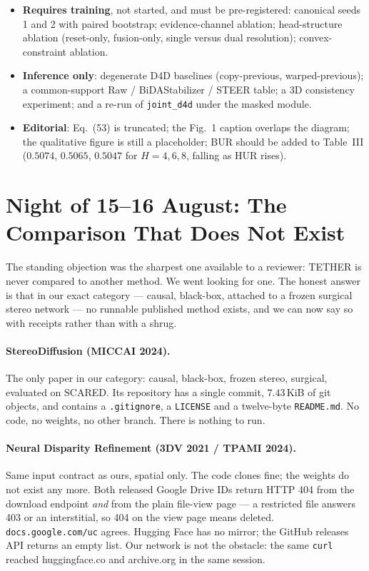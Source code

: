 \documentclass[11pt,a4paper]{article}
\begin{document}
\begin{itemize}[itemsep=2pt]
    \item \textbf{Requires training}, not started, and must be
    pre-registered: canonical seeds 1 and 2 with paired bootstrap;
    evidence-channel ablation; head-structure ablation (reset-only,
    fusion-only, single versus dual resolution); convex-constraint
    ablation.
    \item \textbf{Inference only}: degenerate D4D baselines
    (copy-previous, warped-previous); a common-support
    Raw / BiDAStabilizer / STEER table; a 3D consistency experiment;
    and a re-run of \texttt{joint\_d4d} under the masked module.
    \item \textbf{Editorial}: Eq.~(53) is truncated; the Fig.~1
    caption overlaps the diagram; the qualitative figure is still a
    placeholder; BUR should be added to Table~III
    ($0.5074$, $0.5065$, $0.5047$ for $H = 4, 6, 8$, falling as HUR
    rises).
\end{itemize}


\section*{Night of 15--16 August: The Comparison That Does Not Exist}

The standing objection was the sharpest one available to a reviewer: TETHER
is never compared to another method. We went looking for one. The honest
answer is that in our exact category --- causal, black-box, attached to a
frozen surgical stereo network --- no runnable published method exists, and
we can now say so with receipts rather than with a shrug.

\paragraph{StereoDiffusion (MICCAI 2024).} The only paper in our category:
causal, black-box, frozen stereo, surgical, evaluated on SCARED. Its
repository has a single commit, $7.43$\,KiB of git objects, and contains a
\texttt{.gitignore}, a \texttt{LICENSE} and a twelve-byte \texttt{README.md}.
No code, no weights, no other branch. There is nothing to run.

\paragraph{Neural Disparity Refinement (3DV 2021 / TPAMI 2024).} Same input
contract as ours, spatial only. The code clones fine; the weights do not
exist any more. Both released Google Drive IDs return HTTP 404 from the
download endpoint \emph{and} from the plain file-view page --- a restricted
file answers 403 or an interstitial, so 404 on the view page means deleted.
\texttt{docs.google.com/uc} agrees. Hugging Face has no mirror; the GitHub
releases API returns an empty list. Our network is not the obstacle: the same
\texttt{curl} reached huggingface.co and archive.org in the same session.
\end{document}
